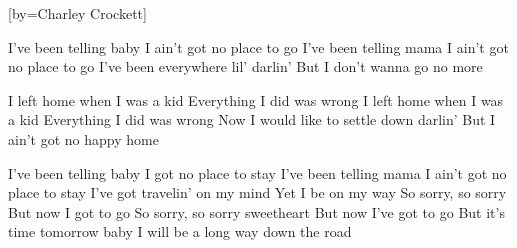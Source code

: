 [by={Charley Crockett}]


  \beginverse
  I've been telling baby
  I ain't got no place to go
  I've been telling mama
  I ain't got no place to go
  I've been everywhere lil' darlin'
  But I don't wanna go no more
  \endverse
  
  \chordsoff

  \beginverse  
  I left home when I was a kid
  Everything I did was wrong
  I left home when I was a kid
  Everything I did was wrong
  Now I would like to settle down darlin'
  But I ain't got no happy home
  \endverse

  
  \beginverse  
  I've been telling baby
  I got no place to stay
  I've been telling mama
  I ain't got no place to stay
  I've got travelin' on my mind
  Yet I be on my way
  \endverse
  \beginverse  
  So sorry, so sorry
  But now I got to go
  So sorry, so sorry sweetheart
  But now I've got to go
  But it's time tomorrow baby
  I will be a long way down the road  
  \endverse

  
\endsong

